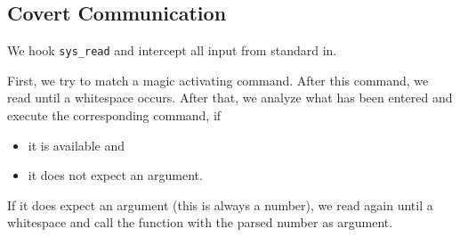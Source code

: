 \documentclass[10pt, letterpaper]{article}
\begin{document}
\subsection{Covert Communication}
We hook \texttt{sys\_read} and intercept all input from standard in. 

First, we try to match a magic activating command. After this command, we read until a whitespace occurs. After that, we analyze what has been entered and execute the corresponding command, if 
\begin{itemize}
 \item it is available and
 \item it does not expect an argument.
\end{itemize}

If it does expect an argument (this is always a number), we read again until a whitespace and call the function with the parsed number as argument.
\end{document}
